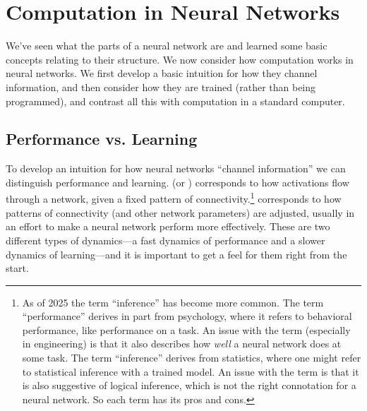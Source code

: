 \section{Computation in Neural Networks}\label{intro_comp_nn}

We've seen what the parts of a neural network are and learned some basic concepts relating to their structure. We now consider  how computation works in neural networks. We first develop a basic intuition for how they channel information, and then consider how they are trained (rather than being programmed), and contrast all this with computation in a standard computer.

\subsection{Performance vs. Learning}\label{performanceLearning}


To develop an intuition for how neural networks ``channel information'' we can distinguish performance and learning.  (or ) corresponds to how activations flow through a network, given a fixed pattern of connectivity.\footnote{As of 2025 the term ``inference'' has become more common. The term ``performance'' derives in part from psychology, where it refers to behavioral performance, like performance on a task.  An issue with the term (especially in engineering) is that it also describes how \emph{well} a neural network does at some task. The term ``inference'' derives from statistics, where one might refer to statistical inference with a trained model. An issue with the term is that it is also suggestive of logical inference, which is not the right connotation for a neural network. So each term has its pros and cons.}   corresponds to how patterns of connectivity (and other network parameters) are adjusted, usually in an effort to make a neural network perform more effectively. These are two different types of dynamics---a fast dynamics of performance and a slower dynamics of learning---and it is important to get a feel for them right from the start.
 
